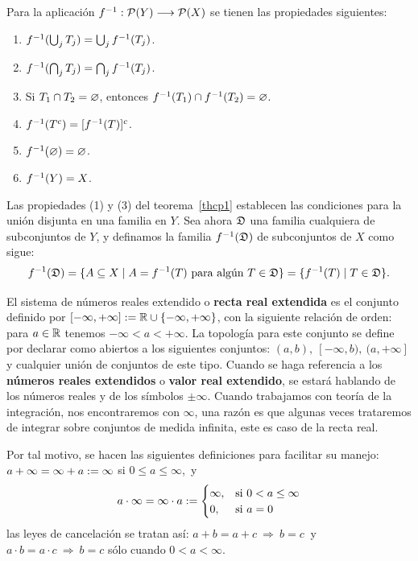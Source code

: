 \begin{thm}\label{thcp1}Para la aplicación $\ff :{\cal{P}} (Y)
\To {\cal{P}} (X)$ se tienen las propiedades siguientes:
\begin{enumerate}
    \vspace{-6pt} \item $f^{-1}(\bigcup_j T_j) = \bigcup_j
    f^{-1}(T_j)$.
    \vspace{-6pt} \item $f^{-1}(\bigcap_j T_j) = \bigcap_j
    f^{-1}(T_j)$.
    \vspace{-6pt} \item Si $T_1\cap T_2=\varnothing$, entonces
    $f^{-1}(T_1)\cap f^{-1}(T_2) = \varnothing$.
    \vspace{-6pt} \item $f^{-1}(T^c) = [f^{-1}(T)]^c$.
    \vspace{-6pt} \item $f^{-1}(\varnothing) = \varnothing$.
    \vspace{-6pt} \item $f^{-1}(Y) = X$.
\end{enumerate}
\end{thm}


Las propiedades (1) y (3) del teorema~\ref{thcp1} establecen las
condiciones para la unión disjunta en una familia en $Y$. Sea ahora
$\mathfrak{D}$ una familia cualquiera de subconjuntos de $Y$, y definamos la
familia $f^{-1} (\mathfrak{D})$ de subconjuntos de $X$ como
sigue:\begin{equation}\label{eq1}
    f^{-1}(\mathfrak{D}) = \{A\subseteq X \mid
A = f^{-1}(T) \mbox{ para algún } T\in \mathfrak{D}\} = \{f^{-1}(T) \mid T\in
\mathfrak{D}\}.
\end{equation}

El sistema de números reales extendido o \textbf{recta real
extendida} es el conjunto definido por $[-\infty,+\infty]:=\mathbb{R} \cup \{-\infty,
+\infty\}$, con la siguiente relación de orden: para $a\in \mathbb{R}$
tenemos $-\infty <a< +\infty$. La topología para este conjunto se
define por declarar como abiertos a los siguientes conjuntos:
$(a,b),\ [-\infty,b),\ (a,+\infty]$ y cualquier unión de conjuntos
de este tipo. Cuando se haga referencia a los \textbf{números reales
extendidos} o \textbf{valor real extendido}, se estará hablando de
los números reales y de los símbolos $\pm\infty$. Cuando trabajamos
con teoría de la integración, nos encontraremos con $\infty$, una
razón es que algunas veces trataremos de integrar sobre conjuntos de
medida infinita, este es caso de la recta real.

Por tal motivo, se hacen las siguientes definiciones para
facilitar su manejo: $a+\infty = \infty+a := \infty$ si $0\leq a
\leq \infty$,~y
\begin{equation}\label{eq4}
    a\cdot \infty = \infty \cdot a
:=\begin{cases}
  \infty, & \mbox{si } 0 < a \leq \infty \\
  0, & \mbox{si } a = 0 \\
\end{cases}
\end{equation}las leyes de cancelación se tratan
así: $a+b = a+c\ \Rightarrow\ b=c\ $ y $a\cdot b =a\cdot c\
\Rightarrow\ b=c$ sólo cuando $0 < a < \infty$. 

